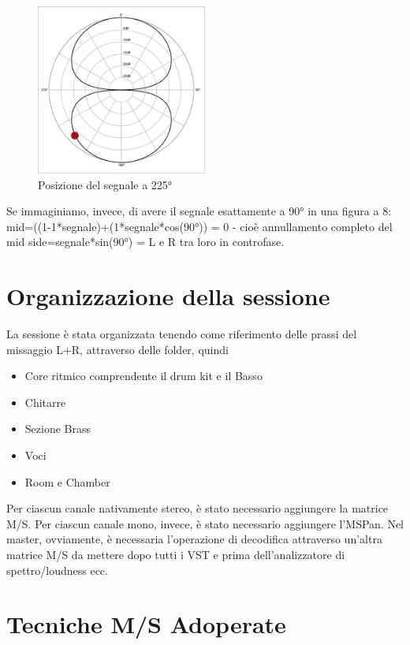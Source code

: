 \documentclass{article}
\begin{document}
    \begin{figure}[H]
        \centering
        \includegraphics[width=0.5\textwidth]{images/225.png}
         \caption{\label{fig10}Posizione del segnale a 225°}
    \end{figure}

    Se immaginiamo, invece, di avere il segnale esattamente a 90° in una figura a 8: \\
    mid=((1-1*segnale)+(1*segnale*cos(90°)) = 0 - cioè annullamento completo del mid side=segnale*sin(90°) = L e R tra loro in controfase.

\section{Organizzazione della sessione}
    La sessione è stata organizzata tenendo come riferimento delle prassi del missaggio L+R, attraverso delle folder, quindi

    \begin{itemize}
        \item Core ritmico comprendente il drum kit e il Basso
        \item Chitarre
        \item Sezione Brass
        \item Voci
        \item Room e Chamber
    \end{itemize}
    
    Per ciascun canale nativamente stereo, è stato necessario aggiungere la matrice M/S. Per ciascun canale mono, invece, è stato necessario aggiungere l'MSPan.
    Nel master, ovviamente, è necessaria l'operazione di decodifica attraverso un'altra matrice M/S da mettere dopo tutti i VST e prima dell'analizzatore di spettro/loudness ecc.
    
\section{Tecniche M/S Adoperate}    
\end{document}
